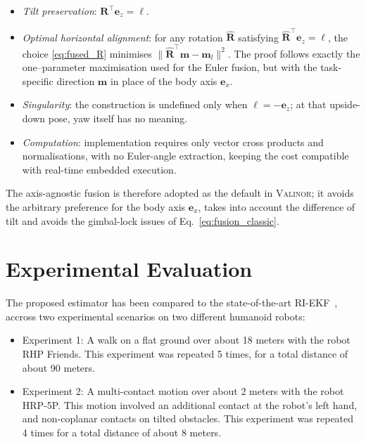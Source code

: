 \documentclass[10pt,twocolumn]{ICCAS}
\begin{document}
\begin{itemize} 
  \item \emph{Tilt preservation}:  
        \(\boldsymbol{R}^{\top}\boldsymbol{e}_{z}=\boldsymbol{\ell}\).

  \item \emph{Optimal horizontal alignment}:  
        for any rotation \(\hat{\boldsymbol{R}}\) satisfying
        \(\hat{\boldsymbol{R}}^{\top}\boldsymbol{e}_{z}=\boldsymbol{\ell}\),
        the choice \eqref{eq:fused_R} minimises $\bigl\|
             \hat{\boldsymbol{R}}^{\top}\boldsymbol{m}-\boldsymbol{m}_{l}
          \bigr\|^{2}$.
        The proof follows exactly the one–parameter maximisation used
        for the Euler fusion, but with the task-specific direction
        \(\boldsymbol{m}\) in place of the body axis
        \(\boldsymbol{e}_{x}\).

  \item \emph{Singularity}:  
        the construction is undefined only when
        \(\boldsymbol{\ell}=-\boldsymbol{e}_{z}\); at that upside-down
        pose, yaw itself has no meaning.

  \item \emph{Computation}:  
        implementation requires only vector cross products and
        normalisations, with no Euler-angle extraction, keeping the cost
        compatible with real-time embedded execution.
\end{itemize}

The axis-agnostic fusion is therefore adopted as the default in {\scshape Valinor}; it avoids the arbitrary preference for the body axis \(\boldsymbol{e}_{x}\), takes into account the difference of tilt and avoids the gimbal-lock issues of Eq.~\eqref{eq:fusion_classic}. 



\section{Experimental Evaluation}

The proposed estimator has been compared to the state-of-the-art RI-EKF~\cite{Hartley2020RIEKF}, accross two experimental scenarios on two different humanoid robots:
\begin{itemize}
    \item Experiment 1: A walk on a flat ground over about 18 meters with the robot RHP Friends. This experiment was repeated 5 times, for a total distance of about 90 meters.
    \item Experiment 2: A multi-contact motion over about 2 meters with the robot HRP-5P. This motion involved an additional contact at the robot's left hand, and non-coplanar contacts on tilted obstacles. This experiment was repeated 4 times for a total distance of about 8 meters.
\end{itemize}
\end{document}
